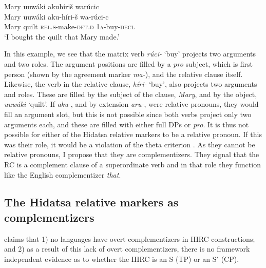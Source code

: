 \documentclass[output=paper]{LSP/langsci}
\begin{document}
\ea \label{boyle25}
 \glll Mary uuw\'aki akuh\'iri\v{s} war\'ucic\\
Mary uuw\'aki aku-h\'iri-\v{s}         wa-r\'uci-c\\
Mary quilt   \textsc{rel.s}-make-\textsc{det.d} \textsc{1a}-buy-\textsc{decl}\\
\trans `I bought the quilt that Mary made.' 
\z

In this example, we see that the matrix verb \textit{r\'uci-} `buy' projects two arguments and two  roles. The argument positions are filled by a \textit{pro} subject, which is first person (shown by the agreement marker \textit{ma-}), and the relative clause itself. Likewise, the verb in the relative clause, \textit{h\'iri-} `buy', also projects two arguments and  roles. These are filled by the subject of the clause, \textit{Mary}, and by the object, \textit{uuw\'aki} `quilt'. If \textit{aku-}, and by extension \textit{aru-}, were relative pronouns, they would fill an argument slot, but this is not possible since both verbs project only two arguments each, and these are filled with either full DPs or \textit{pro}. It is thus not possible for either of the Hidatsa relative markers to be a relative pronoun. If this was their role, it would be a violation of the theta criterion \citep[36]{Chomsky1981}. As they cannot be relative pronouns, I propose that they are complementizers. They signal that the RC is a complement clause of a superordinate verb and in that role they function like the English complementizer \textit{that}. 

\subsection{The Hidatsa relative markers as complementizers}

\citet{Culy1990} claims that 1) no languages have overt complementizers in IHRC constructions; and 2) as a result of this lack of overt complementizers, there is no framework independent evidence as to whether the IHRC is an S (TP) or an S$'$ (CP).  
\end{document}
